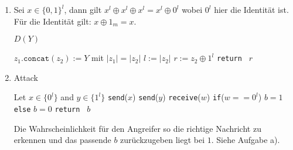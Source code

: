\documentclass[12pt, german]{article}
\begin{document}
\begin{enumerate}[label=\alph*)]
\begin{enumerate}[label=\alph*)]
    	\item	Sei $x \in \{0, 1 \}^l$, dann gilt $x^l \oplus x^l \oplus x^l = x^l \oplus 0^l $ wobei $0^l$ hier die Identität ist. \\ Für die Identität gilt: $x \oplus 1_m = x$.
    
    	\begin{algorithm} 
    		\centering
    		\caption{$D(Y)$}
    		\label{Alg:1}
    		\begin{algorithmic}[1]
    			\State $z_{1}.\texttt{concat}(z_{2}) := Y$ mit $|z_1| = |z_2|$
    			\State $l := |z_2|$
    			\State $r := z_2 \oplus 1^l$
    			\State \texttt{return } $r$
    		\end{algorithmic}
    	\end{algorithm} 		
    		
    		\item
		\begin{algorithm} 
				\centering
				\caption{Attack}
				\label{Alg:2}
			\begin{algorithmic}[1]
					\State Let $x \in \{0^l\}$ and $y \in \{1^l\}$
					\State \texttt{send}($x$)
					\State \texttt{send}($y$)
					\State \texttt{receive}($w$)
					\State \texttt{if}($w == 0^l$) $b=1$ \texttt{else}  $b=0$
					\State \texttt{return } $b$
			\end{algorithmic}
		\end{algorithm} 		
		Die Wahrscheinlichkeit für den Angreifer so die richtige Nachricht zu erkennen und das passende $b$ zurückzugeben liegt bei $1$. Siehe Aufgabe a). 

    	\end{enumerate}
    
    
    
    
    
    
    
    
    \end{enumerate}
\end{document}
